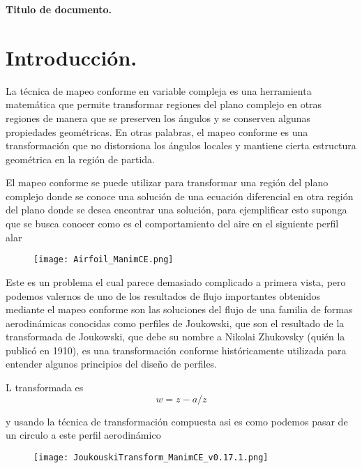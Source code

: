 \documentclass[12pt]{article}
\begin{document}
\newpage
\begin{center}
    \textbf{\Large Titulo de documento.}
    \end{center}

\section*{Introducción.}
	\noindent La técnica de mapeo conforme en variable compleja es una herramienta matemática que permite transformar regiones del plano complejo en otras regiones de manera que se preserven los ángulos y se conserven algunas propiedades geométricas. En otras palabras, el mapeo conforme es una transformación que no distorsiona los ángulos locales y mantiene cierta estructura geométrica en la región de partida.

	El mapeo conforme se puede utilizar para transformar una región del plano complejo donde se conoce una solución de una ecuación diferencial en otra región del plano donde se desea encontrar una solución, para ejemplificar esto suponga que se busca conocer como es el comportamiento del aire en el siguiente perfil alar

	\begin{figure}[!h]
		\begin{small}
			\begin{center}
				\texttt{[image: Airfoil\_ManimCE.png]}
			\end{center}
			\caption{}
			\label{fig:}
		\end{small}
	\end{figure}
	
	\noindent Este es un problema el cual parece demasiado complicado a primera vista, pero podemos valernos de uno de los resultados de flujo importantes obtenidos mediante el mapeo conforme son las soluciones del flujo de una familia de formas aerodinámicas conocidas como perfiles de Joukowski, que son el resultado de  la transformada de Joukowski, que debe su nombre a Nikolai Zhukovsky (quién la publicó en 1910), es una transformación conforme históricamente utilizada para entender algunos principios del diseño de perfiles.
	
	L transformada es
	\begin{equation}
		w = z - a/z
		\label{eq:}
	\end{equation}
	
	y usando la técnica de transformación compuesta asi es como podemos pasar de un circulo a este perfil aerodinámico
	\begin{figure}[!h]
		\begin{small}
			\begin{center}
				\texttt{[image: JoukouskiTransform\_ManimCE\_v0.17.1.png]}
			\end{center}
			\caption{}
			\label{fig:1}
		\end{small}
	\end{figure}
	
\end{document}
